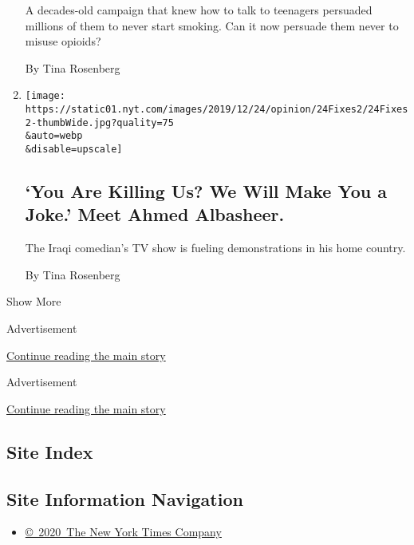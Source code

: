 \begin{enumerate}
  A decades-old campaign that knew how to talk to teenagers persuaded
  millions of them to never start smoking. Can it now persuade them
  never to misuse opioids?

  By Tina Rosenberg
\item
  \href{/2019/12/26/opinion/albasheer-show-iraq-political-revolution.html}{}

  \texttt{[image: https://static01.nyt.com/images/2019/12/24/opinion/24Fixes2/24Fixes2-thumbWide.jpg?quality=75\\\&auto=webp\\\&disable=upscale]}

  \hypertarget{you-are-killing-us-we-will-make-you-a-joke-meet-ahmed-albasheer}{%
  \subsection{`You Are Killing Us? We Will Make You a Joke.' Meet Ahmed
  Albasheer.}\label{you-are-killing-us-we-will-make-you-a-joke-meet-ahmed-albasheer}}

  The Iraqi comedian's TV show is fueling demonstrations in his home
  country.

  By Tina Rosenberg
\end{enumerate}

Show More

Advertisement

\protect\hyperlink{after-mid1}{Continue reading the main story}

Advertisement

\protect\hyperlink{after-mktg}{Continue reading the main story}

\hypertarget{site-index}{%
\subsection{Site Index}\label{site-index}}

\hypertarget{site-information-navigation}{%
\subsection{Site Information
Navigation}\label{site-information-navigation}}

\begin{itemize}
\tightlist
\item
  \href{https://help.nytimes.com/hc/en-us/articles/115014792127-Copyright-notice}{©~2020~The
  New York Times Company}
\end{itemize}

